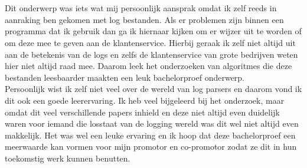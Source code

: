 
\chapter*{}
\label{ch:voorwoord}


Dit onderwerp was iets wat mij persoonlijk aansprak omdat ik zelf reeds in aanraking ben gekomen met log bestanden. Als er problemen zijn binnen een programma dat ik gebruik dan ga ik hiernaar kijken om er wijzer uit te worden of om deze mee te geven aan de klantenservice. Hierbij geraak ik zelf niet altijd uit aan de betekenis van de logs en zelfs de klantenservice van grote bedrijven weten hier niet altijd raad mee. Daarom leek het onderzoeken van algoritmes die deze bestanden leesbaarder maakten een leuk bachelorproef onderwerp.\\

Persoonlijk wist ik zelf niet veel over de wereld van log parsers en daarom vond ik dit ook een goede leerervaring. Ik heb veel bijgeleerd bij het onderzoek, maar omdat dit veel verschillende papers inhield en deze niet altijd even duidelijk waren voor iemand die losstaat van de logging wereld was dit wel niet altijd even makkelijk. Het was wel een leuke ervaring en ik hoop dat deze bachelorproef een meerwaarde kan vormen voor mijn promotor en co-promotor zodat ze dit in hun toekomstig werk kunnen benutten.\\


